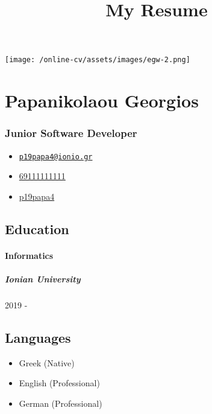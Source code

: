 \documentclass[english,]{article}
\title{My Resume}
\date{}
\providecommand{\tightlist}{%
  \setlength{\itemsep}{0pt}\setlength{\parskip}{0pt}}
\let\oldparagraph\paragraph
\renewcommand{\paragraph}[1]{\oldparagraph{#1}\mbox{}}
\let\oldsubparagraph\subparagraph
\renewcommand{\subparagraph}[1]{\oldsubparagraph{#1}\mbox{}}
\begin{document}
\maketitle

\texttt{[image: /online-cv/assets/images/egw-2.png]}

\hypertarget{papanikolaou-georgios}{%
\section{Papanikolaou Georgios}\label{papanikolaou-georgios}}

\hypertarget{junior-software-developer}{%
\subsubsection{Junior Software
Developer}\label{junior-software-developer}}

\begin{itemize}
\tightlist
\item
  \emph{} \href{mailto:p19papa4@ionio.gr}{\nolinkurl{p19papa4@ionio.gr}}
\item
  \emph{} \href{tel:69111111111}{69111111111}
\item
  \emph{} \href{http://github.com/p19papa4}{p19papa4}
\end{itemize}

\hypertarget{education}{%
\subsection{Education}\label{education}}

\hypertarget{informatics}{%
\paragraph{Informatics}\label{informatics}}

\hypertarget{ionian-university}{%
\subparagraph{Ionian University}\label{ionian-university}}

2019 -

\hypertarget{languages}{%
\subsection{Languages}\label{languages}}

\begin{itemize}
\tightlist
\item
  Greek {(Native)}
\item
  English {(Professional)}
\item
  German {(Professional)}
\end{itemize}
\end{document}
